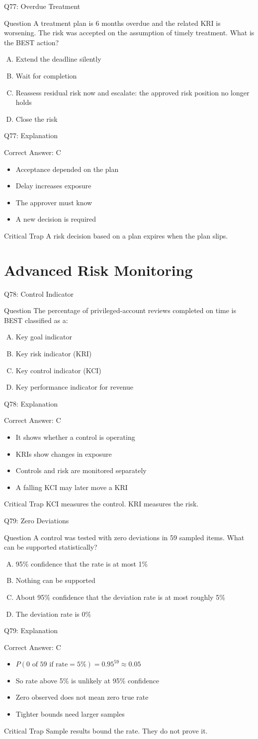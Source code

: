 \documentclass[aspectratio=169]{beamer}
\newcommand{\hq}[7]{%
  \begin{frame}{Q#1: #2}
    \begin{block}{Question}
      #3
    \end{block}
    \begin{enumerate}[(A)]
      #4
    \end{enumerate}
  \end{frame}
  \begin{frame}{Q#1: Explanation}
    \begin{block}{Correct Answer: #5}
      \begin{itemize}
        #6
      \end{itemize}
    \end{block}
    \begin{alertblock}{Critical Trap}
      #7
    \end{alertblock}
  \end{frame}
}
\begin{document}
\hq{77}{Overdue Treatment}
{A treatment plan is 6 months overdue and the related KRI is worsening. The risk was accepted on the assumption of timely treatment. What is the BEST action?}
{\item Extend the deadline silently
 \item Wait for completion
 \item Reassess residual risk now and escalate: the approved risk position no longer holds
 \item Close the risk}
{C}
{\item Acceptance depended on the plan
 \item Delay increases exposure
 \item The approver must know
 \item A new decision is required}
{A risk decision based on a plan expires when the plan slips.}

\section{Advanced Risk Monitoring}

\hq{78}{Control Indicator}
{The percentage of privileged-account reviews completed on time is BEST classified as a:}
{\item Key goal indicator
 \item Key risk indicator (KRI)
 \item Key control indicator (KCI)
 \item Key performance indicator for revenue}
{C}
{\item It shows whether a control is operating
 \item KRIs show changes in exposure
 \item Controls and risk are monitored separately
 \item A falling KCI may later move a KRI}
{KCI measures the control. KRI measures the risk.}

\hq{79}{Zero Deviations}
{A control was tested with zero deviations in 59 sampled items. What can be supported statistically?}
{\item 95\% confidence that the rate is at most 1\%
 \item Nothing can be supported
 \item About 95\% confidence that the deviation rate is at most roughly 5\%
 \item The deviation rate is 0\%}
{C}
{\item $P(\text{0 of 59 if rate} = 5\%) = 0.95^{59} \approx 0.05$
 \item So rate above 5\% is unlikely at 95\% confidence
 \item Zero observed does not mean zero true rate
 \item Tighter bounds need larger samples}
{Sample results bound the rate. They do not prove it.}
\end{document}

